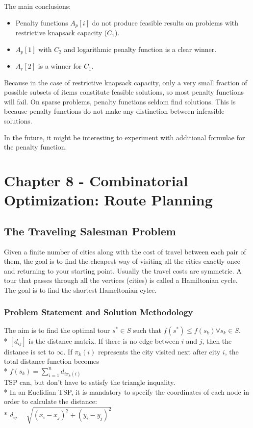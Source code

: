 \documentclass[12pt]{article}
\newcounter{subsubsubsection}[subsubsection]
\begin{document}
The main conclusions:
\begin{itemize}
\item Penalty functions $A_p[i]$ do not produce feasible results on problems with restrictive knapsack capacity ($C_1$).
\item $A_p[1]$ with $C_2$ and logarithmic penalty function is a clear winner.
\item $A_r[2]$ is a winner for $C_1$.
\end{itemize}
Because in the case of restrictive knapsack capacity, only a very small fraction of possible subsets of items constitute feasible solutions, so most penalty functions will fail. On sparse problems, penalty functions seldom find solutions. This is because penalty functions do not make any distinction between infeasible solutions.

In the future, it might be interesting to experiment with additional formulae for the penalty function.
\clearpage

\setcounter{section}{7}
\section{Chapter 8 - Combinatorial Optimization: Route Planning}
\subsection{The Traveling Salesman Problem}
Given a finite number of cities along with the cost of travel between each pair of them, the goal is to find the cheapest way of visiting all the cities exactly once and returning to your starting point. Usually the travel costs are symmetric. A tour that passes through all the vertices (cities) is called a Hamiltonian cycle. The goal is to find the shortest Hameltonian cylce.
\subsubsection{Problem Statement and Solution Methodology}
The aim is to find the optimal tour $s^* \in S$ such that $f(s^*) \leq f(s_k) \forall s_k \in S$.\\*
$[d_{ij}]$ is the distance matrix. If there is no edge between $i$ and $j$, then the distance is set to $\infty$. If $\pi_k(i)$ represents the city visited next after city $i$, the total distance function becomes\\*
$f(s_k) = \sum_{i=1}^nd_{i\pi_k(i)}$\\
TSP can, but don't have to satisfy the triangle inquality.\\*
In an Euclidian TSP, it is mandatory to specify the coordinates of each node in order to calculate the distance:\\*
$d_{ij} = \sqrt{(x_i-x_j)^2 + (y_i - y_j)^2}$
\end{document}
